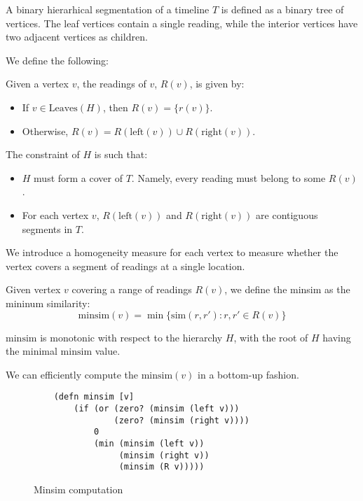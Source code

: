 \begin{definition}
    A binary hierarhical segmentation of a timeline $T$ is defined as a binary
    tree of vertices.  The leaf vertices contain a single reading, while the
    interior vertices have two adjacent vertices as children.
    \label{def:h-seg}
\end{definition}

We define the following:

Given a vertex $v$, the readings of $v$, $R(v)$, is given by:
\begin{itemize}
    \item If $v\in \mathrm{Leaves}(H)$, then $R(v) = \{r(v)\}$.
    \item Otherwise, $R(v) = R(\mathrm{left}(v)) \cup R(\mathrm{right}(v))$.
\end{itemize}

The constraint of $H$ is such that:

\begin{itemize}
    \item $H$ must form a cover of $T$.  Namely, every reading must belong to
        some $R(v)$.
    \item For each vertex $v$, $R(\mathrm{left}(v))$ and $R(\mathrm{right}(v))$
        are contiguous segments in $T$.
\end{itemize}

We introduce a homogeneity measure for each vertex to measure whether the vertex
covers a segment of readings at a single location.

\begin{definition}
    Given vertex $v$ covering a range of readings $R(v)$, we define the minsim
    as the mininum similarity:
    $$\mathrm{minsim}(v) = \min\{\mathrm{sim}(r, r'): r, r'\in R(v)\}$$
\end{definition}

\begin{proposition}
    $\mathrm{minsim}$ is monotonic with respect to the hierarchy $H$, with the
    root of $H$ having the minimal $\mathrm{minsim}$ value.
\end{proposition}

We can efficiently compute the $\mathrm{minsim}(v)$ in a bottom-up fashion.

\begin{figure}
    \begin{verbatim}
    (defn minsim [v]
        (if (or (zero? (minsim (left v))) 
                (zero? (minsim (right v))))
            0
            (min (minsim (left v))
                 (minsim (right v))
                 (minsim (R v)))))
    \end{verbatim}
    \caption{Minsim computation}
\end{figure}


